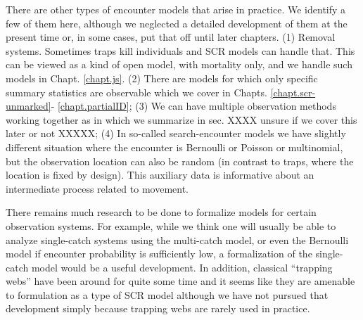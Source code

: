 There are other types of encounter models that arise in practice. We
identify a few of them here, although we neglected a detailed
development of them at the present time or, in some cases, put that
off until later chapters.  (1) Removal systems. Sometimes traps kill
individuals and SCR models can handle that. This can be viewed as a
kind of open model, with mortality only, and we handle such models in
Chapt. \ref{chapt.js}.
(2) There are models for which only
specific summary statistics are observable \citep{chandler_royle:2012}
which we cover in Chapts. \ref{chapt.scr-unmarked}-
\ref{chapt.partialID}; (3) We can have multiple observation methods
working together as in \citet{gopalaswamy_etal:2012ecol} which we
summarize in sec. XXXX unsure if we cover this later or not XXXXX; 
(4) In so-called search-encounter models we
have slightly different situation where the encounter is Bernoulli or
Poisson or multinomial, but the observation location can also be
random (in contrast to traps, where the location is fixed by
design). This auxiliary data is informative about an intermediate 
process related to movement.

There remains much research to be done to formalize models for certain
observation systems. For example, while we think one will usually be
able to analyze single-catch systems using the multi-catch model, or
even the Bernoulli model if encounter probability is sufficiently low, 
a formalization of the single-catch model would be a useful
development.   In addition, classical ``trapping webs''
\citep{anderson_etal:1983, wilson_anderson:1985b, jett_nichols:1987, 
parmenter_etal:1989} have 
been around for quite some time and it seems like they are amenable to
formulation as a type of SCR model although we have not pursued that development
simply because trapping webs are rarely used in practice. 

